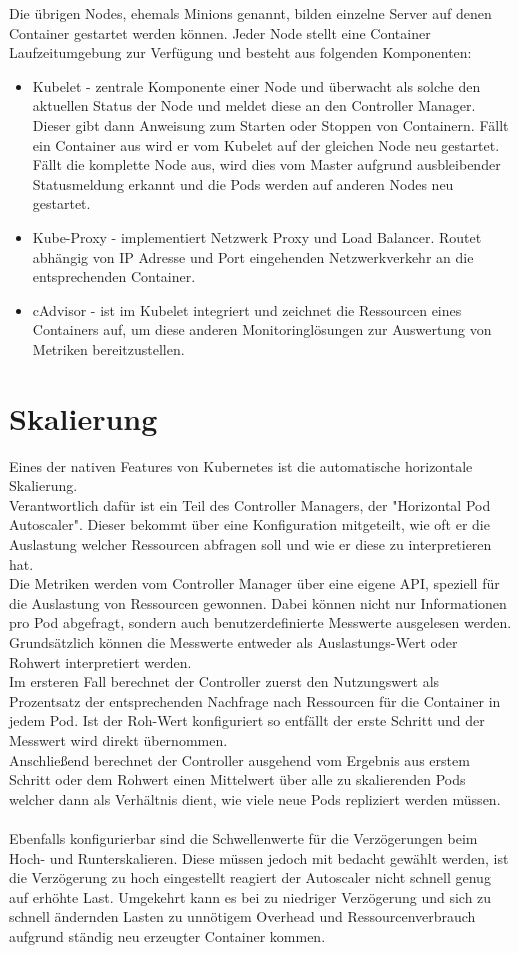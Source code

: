 Die übrigen Nodes, ehemals Minions genannt, bilden einzelne Server auf denen Container gestartet werden können. Jeder Node stellt eine Container Laufzeitumgebung zur Verfügung und besteht aus folgenden Komponenten:
\begin{itemize}
	\item Kubelet - zentrale Komponente einer Node und überwacht als solche den aktuellen Status der Node und meldet diese an den Controller Manager. Dieser gibt dann Anweisung zum Starten oder Stoppen von Containern. Fällt ein Container aus wird er vom Kubelet auf der gleichen Node neu gestartet. Fällt die komplette Node aus, wird dies vom Master aufgrund ausbleibender Statusmeldung erkannt und die Pods werden auf anderen Nodes neu gestartet.
	\item Kube-Proxy - implementiert Netzwerk Proxy und Load Balancer. Routet abhängig von IP Adresse und Port eingehenden Netzwerkverkehr an die entsprechenden Container.
	\item cAdvisor - ist im Kubelet integriert und zeichnet die Ressourcen eines Containers auf, um diese anderen Monitoringlösungen zur Auswertung von Metriken bereitzustellen.
\end{itemize}
\newpage
\section{Skalierung}
Eines der nativen Features von Kubernetes ist die automatische horizontale Skalierung.\\Verantwortlich dafür ist ein Teil des Controller Managers, der "Horizontal Pod Autoscaler".
Dieser bekommt über eine Konfiguration mitgeteilt, wie oft er die Auslastung welcher Ressourcen abfragen soll und wie er diese zu interpretieren hat.\\
Die Metriken werden vom Controller Manager über eine eigene API, speziell für die Auslastung von Ressourcen gewonnen. Dabei können nicht nur Informationen pro Pod abgefragt, sondern auch benutzerdefinierte Messwerte ausgelesen werden.\\
Grundsätzlich können die Messwerte entweder als Auslastungs-Wert oder Rohwert interpretiert werden.\\
Im ersteren Fall berechnet der Controller zuerst den Nutzungswert als Prozentsatz der entsprechenden Nachfrage nach Ressourcen für die Container in jedem Pod.
Ist der Roh-Wert konfiguriert so entfällt der erste Schritt und der Messwert wird direkt übernommen.\\
Anschließend berechnet der Controller ausgehend vom Ergebnis aus erstem Schritt oder dem Rohwert einen Mittelwert über alle zu skalierenden Pods welcher dann als Verhältnis dient, wie viele neue Pods repliziert werden müssen.
\\\\
Ebenfalls konfigurierbar sind die Schwellenwerte für die Verzögerungen beim Hoch- und Runterskalieren. Diese müssen jedoch mit bedacht gewählt werden, ist die Verzögerung zu hoch eingestellt reagiert der Autoscaler nicht schnell genug auf erhöhte Last. Umgekehrt kann es bei zu niedriger Verzögerung und sich zu schnell ändernden Lasten zu unnötigem Overhead und Ressourcenverbrauch aufgrund ständig neu erzeugter Container kommen.
